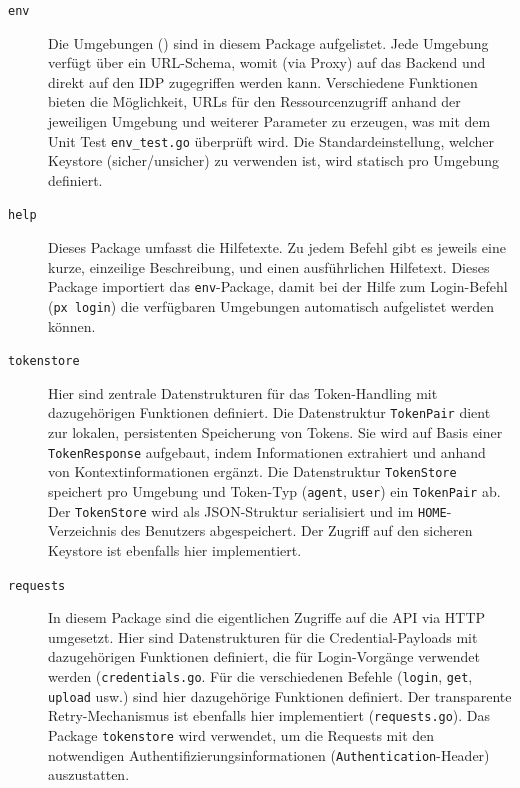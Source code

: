 \begin{description}
    \item[\texttt{env}] Die Umgebungen () sind in diesem Package aufgelistet. Jede Umgebung verfügt über ein URL-Schema, womit (via Proxy) auf das Backend und direkt auf den IDP zugegriffen werden kann. Verschiedene Funktionen bieten die Möglichkeit, URLs für den Ressourcenzugriff anhand der jeweiligen Umgebung und weiterer Parameter zu erzeugen, was mit dem Unit Test \texttt{env\_test.go} überprüft wird. Die Standardeinstellung, welcher Keystore (sicher/unsicher) zu verwenden ist, wird statisch pro Umgebung definiert.
    \item[\texttt{help}] Dieses Package umfasst die Hilfetexte. Zu jedem Befehl gibt es jeweils eine kurze, einzeilige Beschreibung, und einen ausführlichen Hilfetext. Dieses Package importiert das \texttt{env}-Package, damit bei der Hilfe zum Login-Befehl (\texttt{px login}) die verfügbaren Umgebungen automatisch aufgelistet werden können.
    \item[\texttt{tokenstore}] Hier sind zentrale Datenstrukturen für das Token-Handling mit dazugehörigen Funktionen definiert. Die Datenstruktur \texttt{TokenPair} dient zur lokalen, persistenten Speicherung von Tokens. Sie wird auf Basis einer \texttt{TokenResponse} aufgebaut, indem Informationen extrahiert und anhand von Kontextinformationen ergänzt. Die Datenstruktur \texttt{TokenStore} speichert pro Umgebung und Token-Typ (\texttt{agent}, \texttt{user}) ein \texttt{TokenPair} ab. Der \texttt{TokenStore} wird als JSON-Struktur serialisiert und im \texttt{HOME}-Verzeichnis des Benutzers abgespeichert. Der Zugriff auf den sicheren Keystore ist ebenfalls hier implementiert.
    \item[\texttt{requests}] In diesem Package sind die eigentlichen Zugriffe auf die API via HTTP umgesetzt. Hier sind Datenstrukturen für die Credential-Payloads mit dazugehörigen Funktionen definiert, die für Login-Vorgänge verwendet werden (\texttt{credentials.go}. Für die verschiedenen Befehle (\texttt{login}, \texttt{get}, \texttt{upload} usw.) sind hier dazugehörige Funktionen definiert. Der transparente Retry-Mechanismus ist ebenfalls hier implementiert (\texttt{requests.go}). Das Package \texttt{tokenstore} wird verwendet, um die Requests mit den notwendigen Authentifizierungsinformationen (\texttt{Authentication}-Header) auszustatten.

\end{description}
